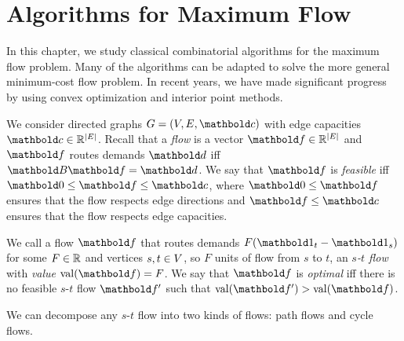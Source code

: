 
\chapter{Algorithms for Maximum Flow}

In this chapter, we study classical combinatorial algorithms for the maximum flow problem. Many of the algorithms can be adapted to solve the more general minimum-cost flow problem. In recent years, we have made significant progress by using convex optimization and interior point methods.

We consider directed graphs $G = (V, E, \vc)$ with edge capacities $\vc \in \R^{|\sE|}$. Recall that a \emph{flow} is a vector $\vf \in \R^{|\sE|}$ and $\vf$ routes demands $\vd$ iff $\mB\vf = \vd$. We say that $\vf$ is \emph{feasible} iff $\vZero \leq \vf \leq \vc$, where $\vZero \leq \vf$ ensures that the flow respects edge directions and $\vf \leq \vc$ ensures that the flow respects edge capacities.

We call a flow $\vf$ that routes demands $F(\vOne_t - \vOne_s)$ for some $F \in \mathbb{R}$ and vertices $s,t \in V$, so $F$ units of flow from $s$ to $t$, an \emph{$s$-$t$ flow} with \emph{value} $\val(\vf) = F$. We say that $\vf$ is \emph{optimal} iff there is no feasible $s$-$t$ flow $\vf'$ such that $\val(\vf') > \val(\vf)$.

We can decompose any $s$-$t$ flow into two kinds of flows: path flows and cycle flows.

